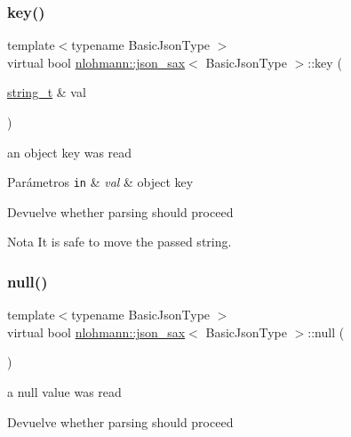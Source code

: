\subsubsection{\texorpdfstring{key()}{key()}}
{\footnotesize\ttfamily template$<$typename Basic\+Json\+Type $>$ \\
virtual bool \mbox{\hyperlink{structnlohmann_1_1json__sax}{nlohmann\+::json\+\_\+sax}}$<$ Basic\+Json\+Type $>$\+::key (\begin{DoxyParamCaption}\item[{\mbox{\hyperlink{structnlohmann_1_1json__sax_ae01977a9f3c5b3667b7a2929ed91061e}{string\+\_\+t}} \&}]{val }\end{DoxyParamCaption})\hspace{0.3cm}{\ttfamily [pure virtual]}}



an object key was read 


\begin{DoxyParams}[1]{Parámetros}
\mbox{\tt in}  & {\em val} & object key \\
\hline
\end{DoxyParams}
\begin{DoxyReturn}{Devuelve}
whether parsing should proceed 
\end{DoxyReturn}
\begin{DoxyNote}{Nota}
It is safe to move the passed string. 
\end{DoxyNote}
\mbox{\label{structnlohmann_1_1json__sax_a0ad26edef3f8d530dcec3192bba82df6}} 
\subsubsection{\texorpdfstring{null()}{null()}}
{\footnotesize\ttfamily template$<$typename Basic\+Json\+Type $>$ \\
virtual bool \mbox{\hyperlink{structnlohmann_1_1json__sax}{nlohmann\+::json\+\_\+sax}}$<$ Basic\+Json\+Type $>$\+::null (\begin{DoxyParamCaption}{ }\end{DoxyParamCaption})\hspace{0.3cm}{\ttfamily [pure virtual]}}



a null value was read 

\begin{DoxyReturn}{Devuelve}
whether parsing should proceed 
\end{DoxyReturn}
\mbox{\label{structnlohmann_1_1json__sax_ae7c31614e8a82164d2d7f8dbf4671b25}} 
